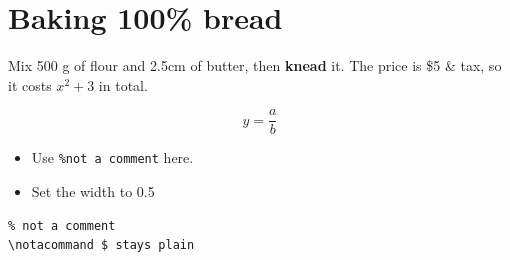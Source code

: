 \documentclass[12pt]{article}
\newcommand{\loaf}[1]{\textbf{#1}}
\begin{document}
\section{Baking 100\% bread}
Mix 500 g of flour and 2.5cm of butter, then \loaf{knead} it. %
The price is \$5 \& tax, so it costs $x^2 + 3$ in total.

\[
  y = \frac{a}{b} %
\]

\begin{itemize}
  \item Use \verb|%not a comment| here.
  \item Set the width to 0.5\textwidth\\
\end{itemize}

\begin{verbatim}
% not a comment
\notacommand $ stays plain
\end{verbatim}
\end{document}
